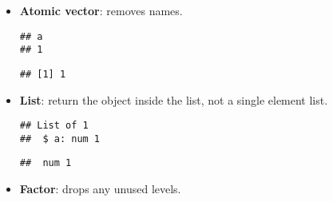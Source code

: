 \begin{itemize}
\item
  \textbf{Atomic vector}: removes names.

\begin{Shaded}
\begin{Highlighting}[]
\StringTok{ }\NormalTok{(} \NormalTok{, } \NormalTok{)}
\NormalTok{x[}\NormalTok{]}
\end{Highlighting}
\end{Shaded}

\begin{verbatim}
## a 
## 1
\end{verbatim}

\begin{Shaded}
\begin{Highlighting}[]
\NormalTok{x[[}\NormalTok{]]}
\end{Highlighting}
\end{Shaded}

\begin{verbatim}
## [1] 1
\end{verbatim}
\item
  \textbf{List}: return the object inside the list, not a single element
  list.

\begin{Shaded}
\begin{Highlighting}[]
\StringTok{ }\NormalTok{(} \NormalTok{, } \NormalTok{)}
\NormalTok{(y[}\NormalTok{])}
\end{Highlighting}
\end{Shaded}

\begin{verbatim}
## List of 1
##  $ a: num 1
\end{verbatim}

\begin{Shaded}
\begin{Highlighting}[]
\NormalTok{(y[[}\NormalTok{]])}
\end{Highlighting}
\end{Shaded}

\begin{verbatim}
##  num 1
\end{verbatim}
\item
  \textbf{Factor}: drops any unused levels.


\end{itemize}
